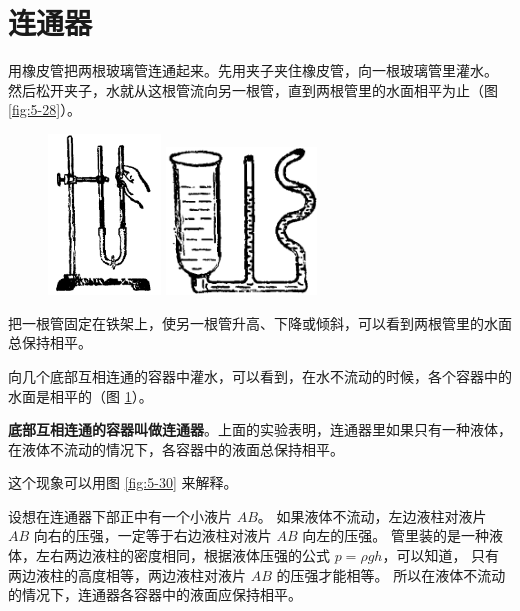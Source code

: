 \section{连通器}\label{sec:5-8}

用橡皮管把两根玻璃管连通起来。先用夹子夹住橡皮管，向一根玻璃管里灌水。
然后松开夹子，水就从这根管流向另一根管，直到两根管里的水面相平为止（图 \ref{fig:5-28}）。

\begin{figure}[htbp]
    \centering
    \begin{minipage}{5cm}
    \centering
    \includegraphics[width=3cm]{../pic/czwl1-ch5-28}
    \caption{}\label{fig:5-28}
    \end{minipage}
    \qquad
    \begin{minipage}{9cm}
    \centering
    \includegraphics[width=4cm]{../pic/czwl1-ch5-29}
    \caption{}\label{fig:5-29}
    \end{minipage}
\end{figure}

把一根管固定在铁架上，使另一根管升高、下降或倾斜，可以看到两根管里的水面总保持相平。

向几个底部互相连通的容器中灌水，可以看到，在水不流动的时候，各个容器中的水面是相平的（图 \ref{fig:5-29}）。

\textbf{底部互相连通的容器叫做连通器}。上面的实验表明，连通器里如果只有一种液体，
在液体不流动的情况下，各容器中的液面总保持相平。

这个现象可以用图 \ref{fig:5-30} 来解释。

设想在连通器下部正中有一个小液片 $AB$。
如果液体不流动，左边液柱对液片 $AB$ 向右的压强，一定等于右边液柱对液片 $AB$ 向左的压强。
管里装的是一种液体，左右两边液柱的密度相同，根据液体压强的公式 $p = \rho gh$，可以知道，
只有两边液柱的高度相等，两边液柱对液片 $AB$ 的压强才能相等。
所以在液体不流动的情况下，连通器各容器中的液面应保持相平。

